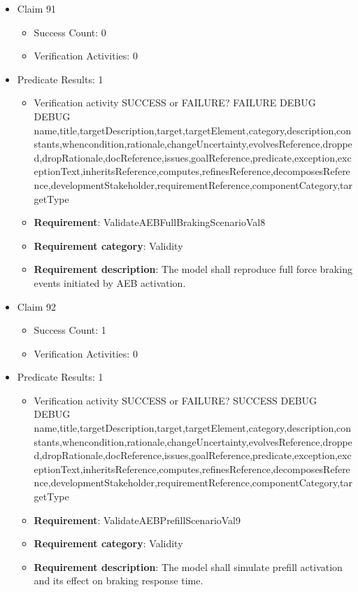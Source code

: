 \documentclass{article}
\begin{document}
\begin{itemize}
  				  \item Claim 91
				\begin{itemize}
			    	\item Success Count: 0 
			    	\item Verification Activities: 0
				\end{itemize}
				
									    
				\item Predicate Results: 1
					\begin{itemize}				
					\item Verification activity SUCCESS or FAILURE? FAILURE
					DEBUG DEBUG name,title,targetDescription,target,targetElement,category,description,constants,whencondition,rationale,changeUncertainty,evolvesReference,dropped,dropRationale,docReference,issues,goalReference,predicate,exception,exceptionText,inheritsReference,computes,refinesReference,decomposesReference,developmentStakeholder,requirementReference,componentCategory,targetType
					\item \textbf{Requirement}: ValidateAEBFullBrakingScenarioVal8 
					\item \textbf{Requirement category}: Validity
					\item \textbf{Requirement description}: The model shall reproduce full force braking events initiated by AEB activation.
					\end{itemize}

  				  \item Claim 92
				\begin{itemize}
			    	\item Success Count: 1 
			    	\item Verification Activities: 0
				\end{itemize}
				
									    
				\item Predicate Results: 1
					\begin{itemize}				
					\item Verification activity SUCCESS or FAILURE? SUCCESS
					DEBUG DEBUG name,title,targetDescription,target,targetElement,category,description,constants,whencondition,rationale,changeUncertainty,evolvesReference,dropped,dropRationale,docReference,issues,goalReference,predicate,exception,exceptionText,inheritsReference,computes,refinesReference,decomposesReference,developmentStakeholder,requirementReference,componentCategory,targetType
					\item \textbf{Requirement}: ValidateAEBPrefillScenarioVal9 
					\item \textbf{Requirement category}: Validity
					\item \textbf{Requirement description}: The model shall simulate prefill activation and its effect on braking response time.
					\end{itemize}


\end{itemize}
\end{document}
